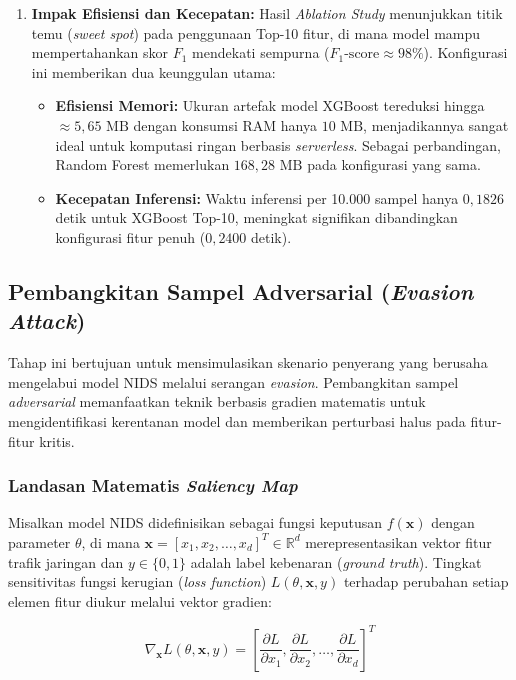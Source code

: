 \documentclass[11pt, a4paper]{article}
\begin{document}
\begin{enumerate}
    \item \textbf{Impak Efisiensi dan Kecepatan:} Hasil \textit{Ablation Study} menunjukkan titik temu (\textit{sweet spot}) pada penggunaan Top-10 fitur, di mana model mampu mempertahankan skor $F_1$ mendekati sempurna ($F_1\text{-score} \approx 98\%$). Konfigurasi ini memberikan dua keunggulan utama:
    \begin{itemize}
        \item \textbf{Efisiensi Memori:} Ukuran artefak model XGBoost tereduksi hingga $\approx 5{,}65\text{ MB}$ dengan konsumsi RAM hanya $10\text{ MB}$, menjadikannya sangat ideal untuk komputasi ringan berbasis \textit{serverless}. Sebagai perbandingan, Random Forest memerlukan $168{,}28\text{ MB}$ pada konfigurasi yang sama.
        \item \textbf{Kecepatan Inferensi:} Waktu inferensi per 10.000 sampel hanya $0{,}1826$ detik untuk XGBoost Top-10, meningkat signifikan dibandingkan konfigurasi fitur penuh ($0{,}2400$ detik).
    \end{itemize}
\end{enumerate}

\subsection{Pembangkitan Sampel Adversarial (\textit{Evasion Attack})}
Tahap ini bertujuan untuk mensimulasikan skenario penyerang yang berusaha mengelabui model NIDS melalui serangan \textit{evasion}. Pembangkitan sampel \textit{adversarial} memanfaatkan teknik berbasis gradien matematis untuk mengidentifikasi kerentanan model dan memberikan perturbasi halus pada fitur-fitur kritis.

\subsubsection{Landasan Matematis \textit{Saliency Map}}
Misalkan model NIDS didefinisikan sebagai fungsi keputusan $f(\mathbf{x})$ dengan parameter $\theta$, di mana $\mathbf{x} = [x_1, x_2, \dots, x_d]^T \in \mathbb{R}^d$ merepresentasikan vektor fitur trafik jaringan dan $y \in \{0, 1\}$ adalah label kebenaran (\textit{ground truth}). Tingkat sensitivitas fungsi kerugian (\textit{loss function}) $L(\theta, \mathbf{x}, y)$ terhadap perubahan setiap elemen fitur diukur melalui vektor gradien:

\begin{equation}
\nabla_{\mathbf{x}} L(\theta, \mathbf{x}, y) = \left[ \frac{\partial L}{\partial x_1}, \frac{\partial L}{\partial x_2}, \dots, \frac{\partial L}{\partial x_d} \right]^T
\end{equation}
\end{document}

